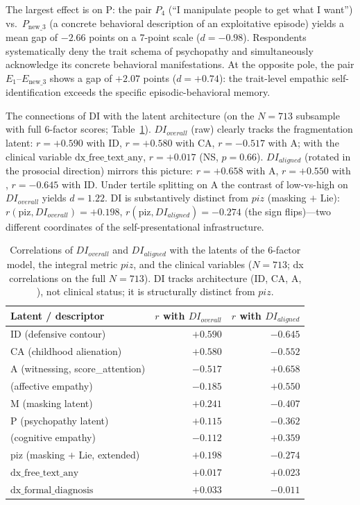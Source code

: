 The largest effect is on P: the pair $P_4$ (``I manipulate people to get what I want'') vs.\ $P_{\text{new\_3}}$ (a concrete behavioral description of an exploitative episode) yields a mean gap of $-2.66$ points on a 7-point scale ($d{=}{-}0.98$). Respondents systematically deny the trait schema of psychopathy and simultaneously acknowledge its concrete behavioral manifestations. At the opposite pole, the pair $E_1$--$E_{\text{new\_3}}$ shows a gap of $+2.07$ points ($d{=}{+}0.74$): the trait-level empathic self-identification exceeds the specific episodic-behavioral memory.

The connections of DI with the latent architecture (on the $N{=}713$ subsample with full 6-factor scores; Table~\ref{tab:di_corr}). $DI_{overall}$ (raw) clearly tracks the fragmentation latent: $r{=}{+}0.590$ with ID, $r{=}{+}0.580$ with CA, $r{=}{-}0.517$ with A; with the clinical variable $\mathrm{dx\_free\_text\_any}$, $r{=}{+}0.017$ (NS, $p{=}0.66$). $DI_{aligned}$ (rotated in the prosocial direction) mirrors this picture: $r{=}{+}0.658$ with A, $r{=}{+}0.550$ with \EAF{}, $r{=}{-}0.645$ with ID. Under tertile splitting on A the contrast of low-vs-high on $DI_{overall}$ yields $d{=}1.22$. DI is substantively distinct from $piz$ (masking $+$ Lie): $r(\text{piz}, DI_{overall}){=}{+}0.198$, $r(\text{piz}, DI_{aligned}){=}{-}0.274$ (the sign flips)---two different coordinates of the self-presentational infrastructure.

\begin{table}[H]
\centering
\begin{tabular}{l r r}
\toprule
Latent / descriptor & $r$ with $DI_{overall}$ & $r$ with $DI_{aligned}$ \\
\midrule
ID (defensive contour) & $+0.590$ & $-0.645$ \\
CA (childhood alienation) & $+0.580$ & $-0.552$ \\
A (witnessing, score\_attention) & $-0.517$ & $+0.658$ \\
\EAF{} (affective empathy) & $-0.185$ & $+0.550$ \\
M (masking latent) & $+0.241$ & $-0.407$ \\
P (psychopathy latent) & $+0.115$ & $-0.362$ \\
\Ecog{} (cognitive empathy) & $-0.112$ & $+0.359$ \\
piz (masking $+$ Lie, extended) & $+0.198$ & $-0.274$ \\
$\mathrm{dx\_free\_text\_any}$ & $+0.017$ & $+0.023$ \\
$\mathrm{dx\_formal\_diagnosis}$ & $+0.033$ & $-0.011$ \\
\bottomrule
\end{tabular}
\caption{Correlations of $DI_{overall}$ and $DI_{aligned}$ with the latents of the 6-factor model, the integral metric $piz$, and the clinical variables ($N{=}713$; dx correlations on the full $N{=}713$). DI tracks architecture (ID, CA, A, \EAF{}), not clinical status; it is structurally distinct from $piz$.}
\label{tab:di_corr}
\end{table}

